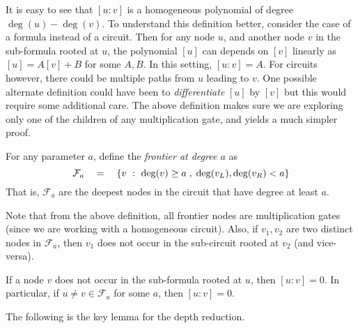 It is easy to see that $[u:v]$ is a homogeneous polynomial of degree $\deg(u) - \deg(v)$. 
To understand this definition better, consider the case of a formula instead of a circuit. Then for any node $u$, and another node $v$ in the sub-formula rooted at $u$, the polynomial $[u]$ can depends on $[v]$ linearly as $[u] = A [v] + B$ for some $A,B$. In this setting, $[u:v] = A$. For circuits however, there could be multiple paths from $u$ leading to $v$. One possible alternate definition could have been to \emph{differentiate} $[u]$ by $[v]$ but this would require some additional care. The above definition makes sure we are exploring only one of the children of any multiplication gate, and yields a much simpler proof. 

\begin{definition}[Frontier]\label{defn:frontier}
For any parameter $a$, define the \emph{frontier at degree $a$} as
\[
\mathcal{F}_a \quad=\quad \left\{{v}\ : \ {\deg(v) \geq a\;,\; \deg(v_L), \deg(v_R) < a}\right\}
\]
That is, $\mathcal{F}_a$ are the deepest nodes in the circuit that have degree at least $a$. 
\end{definition}

Note that from the above definition, all frontier nodes are multiplication gates (since we are working with a homogeneous circuit). Also, if $v_1,v_2$ are two distinct nodes in $\mathcal{F}_a$, then $v_1$ does not occur in the sub-circuit rooted at $v_2$ (and vice-versa). 

\begin{observation}\label{obs:vsbr-antichain}
If a node $v$ does not occur in the sub-formula rooted at $u$, then $[u:v] = 0$. In particular, if $u\neq v\in \mathcal{F}_a$ for some $a$, then $[u:v]=0$.
\end{observation}

The following is the key lemma for the depth reduction. 

